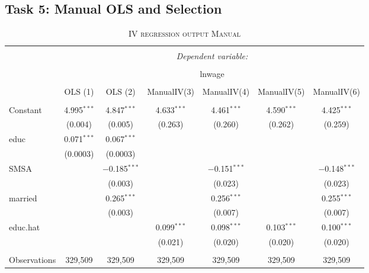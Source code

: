 \documentclass[a4paper]{article}
\begin{document}
\subsection{Task 5: Manual OLS and Selection}

\begin{table}[!htbp] \centering 
\begin{adjustwidth}{0.cm}{-0cm}
\begin{threeparttable}
\small
\captionsetup{font=small, justification=raggedright,singlelinecheck=false}
\caption{\textsc{IV regression output Manual}}
\centering 
  \label{}
\small 
\begin{tabular}{@{\extracolsep{-4pt}}lcccccc} 
\\[-5.8ex]\hline 
\hline \\[-1.8ex] 
 & \multicolumn{6}{c}{\textit{Dependent variable:}} \\ 
\cline{2-7} 
\\[-1.8ex] & \multicolumn{6}{c}{lnwage} \\ 
\\[-1.8ex] & OLS (1) & OLS (2) & ManualIV(3) & ManualIV(4) & ManualIV(5) & ManualIV(6)\\ 
\hline \\[-1.8ex] 
 Constant & 4.995$^{***}$ & 4.847$^{***}$ & 4.633$^{***}$ & 4.461$^{***}$ & 4.590$^{***}$ & 4.425$^{***}$ \\ 
  & (0.004) & (0.005) & (0.263) & (0.260) & (0.262) & (0.259) \\ 
  educ & 0.071$^{***}$ & 0.067$^{***}$ &  &  &  &  \\ 
  & (0.0003) & (0.0003) &  &  &  &  \\ 
  SMSA &  & $-$0.185$^{***}$ &  & $-$0.151$^{***}$ &  & $-$0.148$^{***}$ \\ 
  &  & (0.003) &  & (0.023) &  & (0.023) \\ 
  married &  & 0.265$^{***}$ &  & 0.256$^{***}$ &  & 0.255$^{***}$ \\ 
  &  & (0.003) &  & (0.007) &  & (0.007) \\ 
  educ.hat &  &  & 0.099$^{***}$ & 0.098$^{***}$ & 0.103$^{***}$ & 0.100$^{***}$ \\ 
  &  &  & (0.021) & (0.020) & (0.020) & (0.020) \\ 
 \hline \\[-1.8ex] 
Observations & 329,509 & 329,509 & 329,509 & 329,509 & 329,509 & 329,509 \\ 

\end{tabular}
\end{threeparttable}
\end{adjustwidth}
\end{table}
\end{document}
